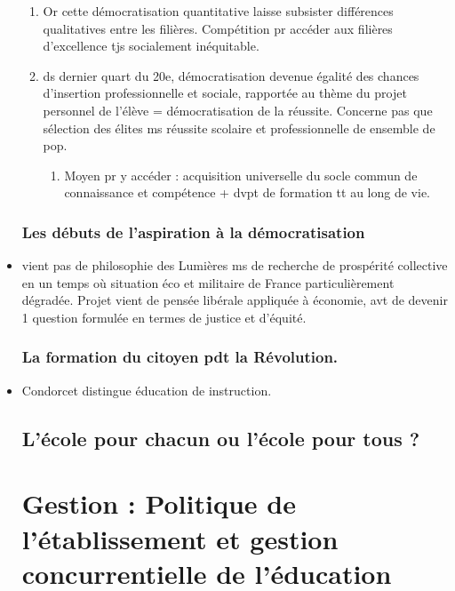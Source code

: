 \documentclass[12pt]{report}
\begin{document}
\begin{itemize}
\begin{enumerate}
\item Or cette démocratisation quantitative laisse subsister différences qualitatives entre les filières. Compétition pr accéder aux filières d'excellence tjs socialement inéquitable. \\

\item ds dernier quart du 20e, démocratisation devenue égalité des chances d'insertion professionnelle et sociale, rapportée au thème du projet personnel de l'élève = démocratisation de la réussite. Concerne pas que sélection des élites ms réussite scolaire et professionnelle de ensemble de pop.
\begin{enumerate}
\item Moyen pr y accéder : acquisition universelle du socle commun de connaissance et compétence + dvpt de formation tt au long de vie. \\
\end{enumerate}
\end{enumerate}

\section{Les débuts de l'aspiration à la démocratisation}

\item vient pas de philosophie des Lumières ms de recherche de prospérité collective en un temps où situation éco et militaire de France particulièrement dégradée. Projet vient de pensée libérale appliquée à économie, avt de devenir 1 question formulée en termes de justice et d'équité. \\

\section{La formation du citoyen pdt la Révolution.}

\item Condorcet distingue éducation de instruction. 










\chapter{L'école pour chacun ou l'école pour tous ?}

\part{Gestion : Politique de l'établissement et gestion concurrentielle de l'éducation}


\end{itemize}
\end{document}
